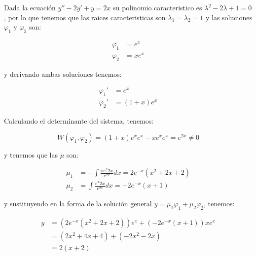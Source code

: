 		\begin{ejemplo}
			Dada la ecuación $y'' - 2 y' + y = 2x$ su polinomio caracteristico es $\lambda^2 - 2 \lambda + 1 = 0$, por lo que tenemos que las raices caracteristicas son $\lambda_1 = \lambda_2 = 1$ y las soluciones $\varphi_1$ y $\varphi_2$ son:

			\begin{align*}
				\varphi_1 &= e^x \\
				\varphi_2 &= x e^x
			\end{align*}

			y derivando ambas soluciones tenemos:

			\begin{align*}
				\varphi_1' &= e^x \\
				\varphi_2' &= (1 + x) e^x
			\end{align*}

			Calculando el determinante del sistema, tenemos:

			\begin{equation*}
				W(\varphi_1, \varphi_2) = (1 + x) e^x e^x - x e^x e^x = e^{2x} \ne 0
			\end{equation*}

			y tenemos que las $\mu$ son:

			\begin{align*}
				\mu_1 &= - \int \frac{x e^x 2x}{e^{2x}} dx = 2 e^{-x} (x^2 + 2 x + 2) \\
				\mu_2 &= \int \frac{e^x 2x}{e^{2x}} dx = -2 e^{-x}(x + 1)
			\end{align*}

			y sustituyendo en la forma de la solución general $y = \mu_1 \varphi_1 + \mu_2 \varphi_2$, tenemos:

			\begin{align*}
				y &= (2 e^{-x} (x^2 + 2 x + 2)) e^x + (-2 e^{-x}(x + 1)) x e^x \\
				&= (2 x^2 + 4 x + 4) + (-2 x^2 - 2 x) \\
				&= 2 (x + 2)
			\end{align*}
		\end{ejemplo}

